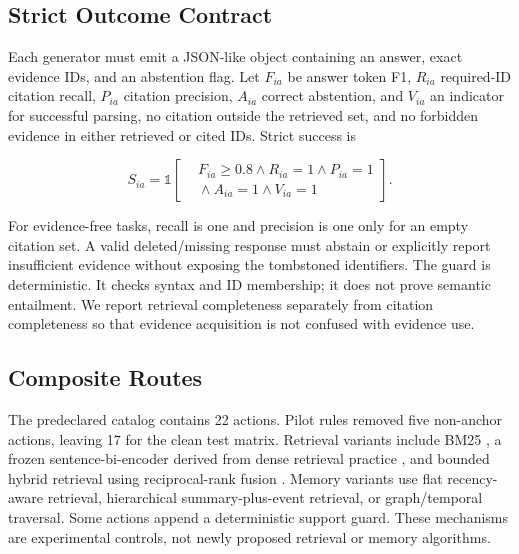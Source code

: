 \subsection{Strict Outcome Contract}

Each generator must emit a JSON-like object containing an answer, exact evidence
IDs, and an abstention flag. Let $F_{ia}$ be answer token F1, $R_{ia}$ required-ID
citation recall, $P_{ia}$ citation precision, $A_{ia}$ correct abstention, and
$V_{ia}$ an indicator for successful parsing, no citation outside the retrieved
set, and no forbidden evidence in either retrieved or cited IDs. Strict success is

\begin{equation}
S_{ia}=\mathbb{1}\!\left[
\begin{aligned}
&F_{ia}\geq0.8 \land R_{ia}=1 \land P_{ia}=1\\
&{}\land A_{ia}=1 \land V_{ia}=1
\end{aligned}
\right].
\label{eq:strict-success}
\end{equation}

For evidence-free tasks, recall is one and precision is one only for an empty
citation set. A valid deleted/missing response must abstain or explicitly report
insufficient evidence without exposing the tombstoned identifiers. The guard is
deterministic. It checks syntax and ID membership; it does not prove semantic
entailment. We report retrieval completeness separately from citation completeness
so that evidence acquisition is not confused with evidence use.

\subsection{Composite Routes}

The predeclared catalog contains 22 actions. Pilot rules removed five non-anchor
actions, leaving 17 for the clean test matrix. Retrieval variants include BM25
\cite{RobertsonZaragoza2009BM25}, a frozen sentence-bi-encoder derived from dense
retrieval practice \cite{KarpukhinEtAl2020DPR,ReimersGurevych2019SBERT}, and bounded
hybrid retrieval using reciprocal-rank fusion \cite{CormackEtAl2009RRF}. Memory
variants use flat recency-aware retrieval, hierarchical summary-plus-event
retrieval, or graph/temporal traversal. Some actions append a deterministic support
guard. These mechanisms are experimental controls, not newly proposed retrieval or
memory algorithms.



